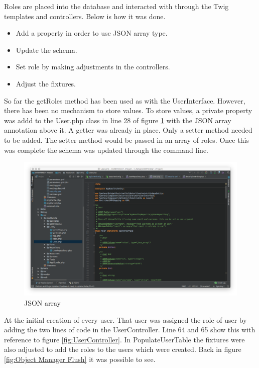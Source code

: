 Roles are placed into the database and interacted with through the Twig templates and controllers. Below is how it was done.

\begin{itemize}
  \item Add a property in order to use JSON array type.
    \item Update the schema.
      \item Set role by making adjustments in the controllers.
        \item Adjust the fixtures.
\end{itemize}

So far the getRoles method has been used as with the UserInterface. However, there has been no mechanism to store values. To store values, a private property was addd to the User.php class in line 28 of figure \ref{fig:JSON array} with the JSON array annotation above it. A getter was already in place. Only a setter method needed to be added. The setter method would be passed in an array of roles. Once this was complete the schema was updated through the command line.

\begin{figure}[htbp]
   \centering
   \includegraphics[width=400pt]{figures/json_array.png} %
   \caption{JSON array}
   \label{fig:JSON array}
\end{figure}

At the initial creation of every user. That user was assigned the role of user by adding the two lines of code in the UserController. Line 64 and 65 show this with reference to figure \ref{fig:UserController}. In PopulateUserTable the fixtures were also adjusted to add the roles to the users which were created. Back in figure \ref{fig:Object Manager Flush} it was possible to see.

